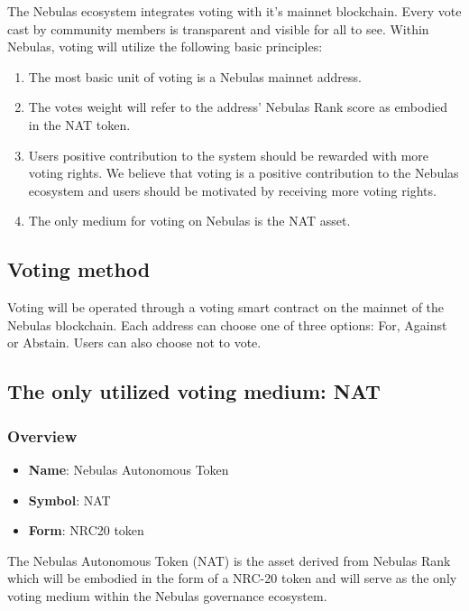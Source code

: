 The Nebulas ecosystem integrates voting with it's mainnet blockchain. Every vote cast by community members is transparent and visible for all to see. Within Nebulas, voting will utilize the following basic principles:

\begin{enumerate}
	\item The most basic unit of voting is a Nebulas mainnet address.
	\item The votes weight will refer to the address' Nebulas Rank score as embodied in the NAT token.
	\item Users positive contribution to the system should be rewarded with more voting rights. We believe that voting is a positive contribution to the Nebulas ecosystem and users should be motivated by receiving more voting rights.
	\item The only medium for voting on Nebulas is the NAT asset.
\end{enumerate}

\subsection{Voting method}

Voting will be operated through a voting smart contract on the mainnet of the Nebulas blockchain. Each address can choose one of three options: For, Against or Abstain. Users can also choose not to vote.

\subsection{The only utilized voting medium: NAT}

\label{nat}

\subsubsection{Overview}

\begin{itemize}
	\item \textbf{Name}: Nebulas Autonomous Token
	\item \textbf{Symbol}: NAT
	\item \textbf{Form}: NRC20 token
\end{itemize}

The Nebulas Autonomous Token (NAT) is the asset derived from Nebulas Rank which will be embodied in the form of a NRC-20 token and will serve as the only voting medium within the Nebulas governance ecosystem.


